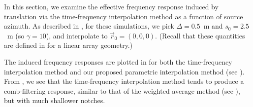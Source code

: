 In this section, we examine the effective frequency response induced by translation via the time-frequency interpolation method as a function of source azimuth.
As described in , for these simulations, we pick $\Delta = 0.5$~m and $s_0 = 2.5$~m (so $\gamma = 10$), and interpolate to $\vec{r}_0 = (0, 0, 0)$.
(Recall that these quantities are defined in  for a linear array geometry.)

The induced frequency responses are plotted in  for both the time-frequency interpolation method and our proposed parametric interpolation method (see ).
From , we see that the time-frequency interpolation method tends to produce a comb-filtering response, similar to that of the weighted average method (see ), but with much shallower notches.

